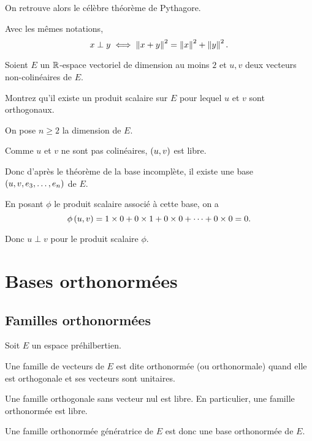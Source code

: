 On retrouve alors le célèbre théorème de Pythagore.

\begin{prop}
Avec les mêmes notations, \[x\perp y\ssi\norme{x+y}^2=\norme{x}^2+\norme{y}^2.\]
\end{prop}

\begin{exo}
Soient \(E\) un \(\mathbb{R}\)-espace vectoriel de dimension au moins \(2\) et \(u,v\) deux vecteurs non-colinéaires de \(E\).

Montrez qu'il existe un produit scalaire sur \(E\) pour lequel \(u\) et \(v\) sont orthogonaux.
\end{exo}

\begin{corr}
On pose \(n\geq2\) la dimension de \(E\).

Comme \(u\) et \(v\) ne sont pas colinéaires, \(\left(u,v\right)\) est libre.

Donc d'après le théorème de la base incomplète, il existe une base \(\left(u,v,e_3,\dots,e_n\right)\) de \(E\).

En posant \(\phi\) le produit scalaire associé à cette base, on a \[\phi\left(u,v\right)=1\times0+0\times1+0\times0+\dots+0\times0=0.\]

Donc \(u\perp v\) pour le produit scalaire \(\phi\).
\end{corr}

\section{Bases orthonormées}

\subsection{Familles orthonormées}

\begin{defi}
Soit \(E\) un espace préhilbertien.

Une famille de vecteurs de \(E\) est dite orthonormée (ou orthonormale) quand elle est orthogonale et ses vecteurs sont unitaires.
\end{defi}

\begin{prop}
Une famille orthogonale sans vecteur nul est libre. En particulier, une famille orthonormée est libre.

Une famille orthonormée génératrice de \(E\) est donc une base orthonormée de \(E\).
\end{prop}

